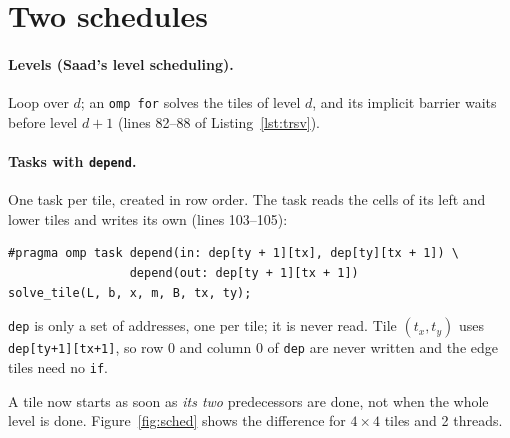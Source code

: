 \documentclass[11pt,a4paper]{article}
\let\origtexttt\texttt
\renewcommand{\texttt}[1]{\textcolor{black!60}{\origtexttt{#1}}}
\begin{document}
\section{Two schedules}
\paragraph{Levels (Saad's level scheduling).} Loop over $d$; an \texttt{omp for} solves the
tiles of level $d$, and its implicit barrier waits before level $d+1$ (lines 82--88 of
Listing~\ref{lst:trsv}).

\paragraph{Tasks with \texttt{depend}.} One task per tile, created in row order. The task
reads the cells of its left and lower tiles and writes its own (lines 103--105):
\begin{lstlisting}
#pragma omp task depend(in: dep[ty + 1][tx], dep[ty][tx + 1]) \
                 depend(out: dep[ty + 1][tx + 1])
solve_tile(L, b, x, m, B, tx, ty);
\end{lstlisting}
\texttt{dep} is only a set of addresses, one per tile; it is never read. Tile $(t_x,t_y)$ uses
\texttt{dep[ty+1][tx+1]}, so row 0 and column 0 of \texttt{dep} are never written and the edge
tiles need no \texttt{if}.

A tile now starts as soon as \emph{its two} predecessors are done, not when the whole level is
done. Figure~\ref{fig:sched} shows the difference for $4\times4$ tiles and 2 threads.
\end{document}
